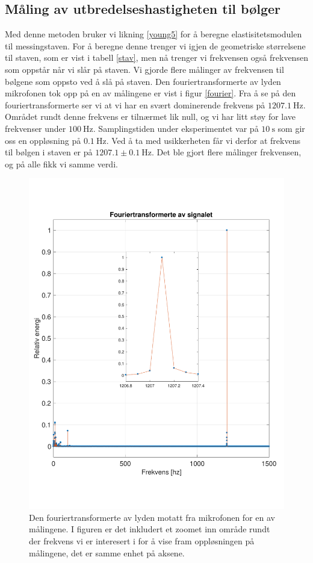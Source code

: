 \documentclass[%
 reprint,
 amsmath,amssymb,
 aps,
 norsk,
 booktabs
]{revtex4-1}
\begin{document}
\subsection{Måling av utbredelseshastigheten til bølger}
Med denne metoden bruker vi likning \eqref{young5} for å beregne elastisitetsmodulen til messingstaven. For å beregne denne trenger vi igjen de geometriske størrelsene til staven, som er vist i tabell \vref{stav}, men nå trenger vi frekvensen også frekvensen som oppstår når vi slår på staven.
Vi gjorde flere målinger av frekvensen til bølgene som oppsto ved å slå på staven. Den fouriertransformerte av lyden mikrofonen tok opp på en av målingene er vist i figur \vref{fourier}. Fra å se på den fouriertransformerte ser vi at vi har en svært dominerende frekvens på $\SI{1207.1}{\hertz}$. Området rundt denne frekvens er tilnærmet lik null, og vi har litt støy for lave frekvenser under $\SI{100}{\hertz}$. Samplingstiden under eksperimentet var på $\SI{10}{\second}$ som gir oss en oppløsning på $\SI{0.1}{\hertz}$. Ved å ta med usikkerheten får vi derfor at frekvens til bølgen i staven er på $1207.1\pm\SI{0.1}{\hertz}$. Det ble gjort flere målinger frekvensen, og på alle fikk vi samme verdi.
\begin{figure}[h!]
  \centering
  \includegraphics[scale=0.4]{fourier.pdf}
  \caption{Den fouriertransformerte av lyden motatt fra mikrofonen for en av målingene. I figuren er det inkludert et zoomet inn område rundt der frekvens vi er interesert i for å vise fram oppløsningen på målingene, det er samme enhet på aksene.}
  \label{fourier}
\end{figure}
\end{document}
